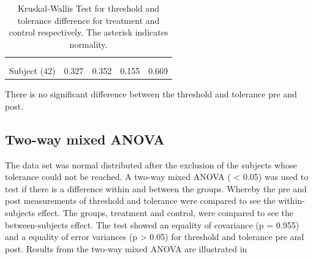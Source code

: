\begin{longtable} {l|c|c|c|c}
	\caption{Kruskal-Wallis Test for threshold and tolerance difference for treatment and control respectively. The asterisk indicates normality.}
	\label{tab:KruskalWallis1} \\ 
	 \cellcolor[HTML]{C0C0C0} {} &
\multicolumn{2}{c|}{ \cellcolor[HTML]{C0C0C0}{\textbf{Threshold}}} & \multicolumn{2}{c}{ \cellcolor[HTML]{C0C0C0}{\textbf{Tolerance}}}  	\\  \rule{0pt}{3ex} 
  \cellcolor[HTML]{C0C0C0}{} &
 \multicolumn{1}{c|}{ \cellcolor[HTML]{C0C0C0}{Pre }} & \multicolumn{1}{c|}{ \cellcolor[HTML]{C0C0C0}{Post}} 
 & \multicolumn{1}{|c|}{ \cellcolor[HTML]{C0C0C0}{Pre}} 
 & \multicolumn{1}{c}{ \cellcolor[HTML]{C0C0C0}{Post}} 	\\ \hline
Subject (42) & 0.327  & 0.352 & 0.155  & 0.669 \\ \hline
\end{longtable}
\vspace{-.5cm}

There is no significant difference between the threshold and tolerance pre and post.

\subsection{Two-way mixed ANOVA}

The data set was normal distributed after the exclusion of the subjects whose tolerance
could not be reached. A two-way mixed ANOVA ( < 0.05) was used to test if there is a difference within and between the groups. Whereby the pre and post measurements of threshold and tolerance were compared to see the  within-subjects effect. The groups, treatment and control, were compared to see the between-subjects effect. The test showed an equality of covariance (p = 0.955) and a equality
of error variances (p > 0.05) for threshold and tolerance pre and post. Results from the
two-way mixed ANOVA are illustrated in 

